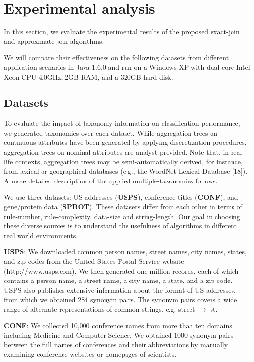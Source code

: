 \section{Experimental analysis}

In this section, we evaluate the experimental results of
the proposed exact-join and approximate-join algorithms. 

 We will compare
their effectiveness on the following datasets from different
application scenarios in Java $1.6.0$ and run on a
Windows XP with dual-core Intel Xeon CPU 4.0GHz, 2GB RAM, and a 320GB hard disk.


\subsection{Datasets}


To evaluate the impact of taxonomy information on classification performance, we generated taxonomies over each dataset.
While aggregation trees on continuous attributes have been generated by applying discretization procedures, aggregation trees
on nominal attributes are analyst-provided. Note that, in real-life contexts, aggregation trees may be semi-automatically derived, for instance, from lexical or geographical databases (e.g., the WordNet Lexical Database [18]). A more detailed description of the
applied multiple-taxonomies follows.


We use three datasets: US addresses (\textbf{USPS}),
conference titles  (\textbf{CONF}), and gene/protein data
(\textbf{SPROT}). These datasets differ from each other in terms of rule-number, rule-complexity, data-size and string-length. Our goal in choosing these diverse sources is to understand the usefulness of algorithms in different real world environments.

\smallskip
\noindent \textbf{{USPS}}: We downloaded common person names, street names,
city names, states, and zip codes from the United States Postal
Service website ({\footnotesize http://www.usps.com}). We then generated
one million records, each of which contains a person name, a street
name, a city name, a state, and a zip code. USPS also publishes
extensive information about the format of US addresses, from which we
obtained 284 synonym pairs. The synonym pairs covers a wide range of alternate
representations of common strings, e.g. street $\rightarrow$ st.


\noindent \textbf{{CONF}}: We collected 10,000 conference names
from more than ten domains, including Medicine and Computer
Science.
We obtained $1000$ synonym pairs between the full names of conferences and their
abbreviations by manually examining conference websites or homepages
of scientists.


